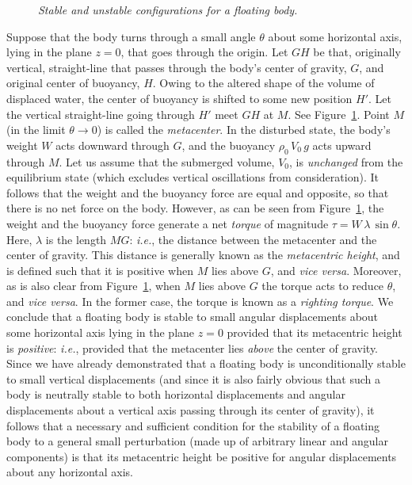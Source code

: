 \begin{figure}
\epsfysize=3in
\centerline{}
\caption{\em Stable and unstable configurations for a floating body.}\label{f6.01}
\end{figure}

Suppose that the body turns through a small angle $\theta$ about some horizontal axis, lying in the plane $z=0$, that goes through the origin. 
Let $GH$ be that, originally vertical, straight-line that passes through the body's center of gravity, $G$, and
 original center of buoyancy, $H$. Owing to the altered shape of the volume of displaced water, the
center of buoyancy is shifted to some new position $H'$. Let the vertical straight-line
going through $H'$ meet $GH$ at $M$. See Figure~\ref{f6.01}. Point $M$ (in the limit $\theta\rightarrow 0$) is called the {\em metacenter}.
In the disturbed state, the body's weight $W$ acts downward through $G$, and
the buoyancy $\rho_0\,V_0\,g$ acts upward through $M$. Let us assume that the submerged volume, $V_0$,
is {\em unchanged}\/ from the equilibrium state (which excludes vertical oscillations from consideration). It follows that the weight and
the buoyancy force are equal and opposite, so
that there is no net force on the body. However, as can be seen from Figure~\ref{f6.01}, the weight and the buoyancy force generate a net {\em torque}\/ of magnitude $\tau=W\,\lambda\,\sin\theta$. Here, $\lambda$ is the length $MG$: {\em i.e.}, the distance  between the metacenter and the
center of gravity. This distance is generally known as the {\em metacentric height}, and is defined such that it is
 positive when $M$ lies above $G$, and {\em vice versa}. 
Moreover, as is also clear from Figure~\ref{f6.01}, when $M$ lies above $G$ the torque acts to reduce $\theta$, and {\em vice versa}.  In the former case, the torque is known as
a {\em righting torque}. We conclude that a floating body is stable to small angular displacements about some horizontal axis lying
in the plane $z=0$
provided that its metacentric height is {\em positive}: {\em i.e.}, provided that the metacenter lies {\em above}\/ the
center of gravity. Since we have already demonstrated that a floating body is unconditionally stable to
small vertical displacements (and since it is also  fairly obvious that such a body is 
neutrally stable to both  horizontal displacements and angular displacements about a vertical axis passing through its center of gravity), it follows that a necessary and sufficient condition for the stability
of a floating body to a general small perturbation (made up of arbitrary linear and angular components)
is that its metacentric height be positive for angular displacements about any horizontal axis. 

